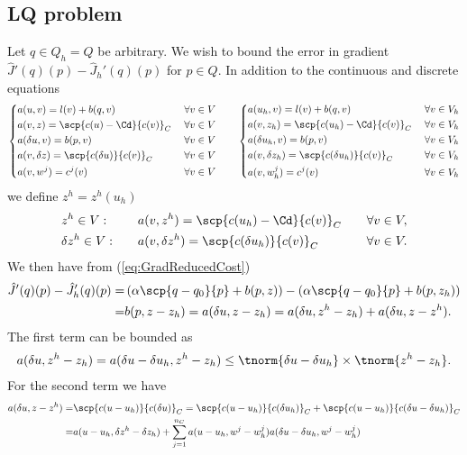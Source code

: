 \subsection{LQ problem}\label{subsec:}
%
%
Let $q\in Q_h=Q$ be arbitrary. We wish to bound the error in gradient $\hat J'(q)(p) - \hat J_h'(q)(p)$ for $p\in Q$. In addition to the continuous and discrete equations
%
\begin{align*}
%
\left\{
\begin{aligned}
&a(u, v) = l(v) + b(q,v)&\; \forall v\in V\\
&a(v,z) = \scp{c(u)-\Cd}{c(v)}_C&\; \forall v\in V\\
&a(\delta u,v) = b(p,v)&\; \forall v\in V\\
&a(v,\delta z) = \scp{c(\delta u)}{c(v)}_C&\; \forall v\in V\\
&a(v,w^j) = c^j(v)&\; \forall v\in V
\end{aligned}
\right.
%
\qquad
%
\left\{
\begin{aligned}
&a(u_h, v) = l(v) + b(q,v)&\; \forall v\in V_h\\
&a(v,z_h) = \scp{c(u_h)-\Cd}{c(v)}_C&\; \forall v\in V_h\\
&a(\delta u_h,v) = b(p,v)&\; \forall v\in V_h\\
&a(v,\delta z_h) = \scp{c(\delta u_h)}{c(v)}_C&\; \forall v\in V_h\\
&a(v,w^j_h) = c^j(v)&\; \forall v\in V_h
\end{aligned}
\right.
%
\end{align*}
%
we define $z^h=z^h(u_h)$
%
\begin{alignat*}{3}
&z^h\in V:&\quad& a(v,z^h) = \scp{c(u_h)-\Cd}{c(v)}_C&\quad \forall v\in V,\\
&\delta z^h\in V:&\quad& a(v,\delta z^h) = \scp{c(\delta u_h)}{c(v)}_C&\; \forall v\in V.
\end{alignat*}
%
We then have from (\ref{eq:GradReducedCost})
%
\begin{align*}
\hat J'(q)(p) - \hat J_h'(q)(p) =& \left( \alpha\scp{q-q_0}{p} + b(p,z)\right) - \left( \alpha\scp{q-q_0}{p} + b(p,z_h)\right)\\
=& b(p,z - z_h) = a(\delta u,z - z_h) = a(\delta u,z^h - z_h) + a(\delta u,z - z^h).
\end{align*}
%
The first term can be bounded as
%
\begin{align*}
a(\delta u,z^h - z_h) = a(\delta u-\delta u_h,z^h - z_h) \le  \tnorm{\delta u-\delta u_h} \times\tnorm{z^h - z_h}.
\end{align*}
%
For the second term we have
%
\begin{align*}
a(\delta u,z - z^h) =& \scp{c(u-u_h)}{c(\delta u)}_C = \scp{c(u-u_h)}{c(\delta u_h)}_C + \scp{c(u-u_h)}{c(\delta u-\delta u_h)}_C\\
=& a(u-u_h,\delta z^h - \delta z_h) + \sum_{j=1}^{n_C} a(u-u_h, w^j-w^j_h)a(\delta u-\delta u_h, w^j-w^j_h)
\end{align*}
%






\printbibliography[title=References Section~\thesection]

